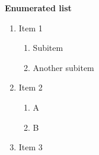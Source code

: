 \textbf{Enumerated list}

\begin{enumerate}
	\item Item 1
		\begin{enumerate}
			\item Subitem
			\item Another subitem
		\end{enumerate}
	\item Item 2
		\begin{enumerate}
			\item A
			\item B
		\end{enumerate}
	\item Item 3
\end{enumerate}


